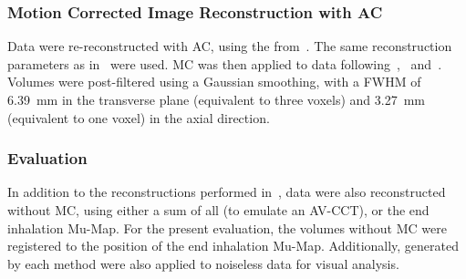             \subsubsection{Motion Corrected Image Reconstruction with AC} \label{sec:comparison_of_motion_correction_methods_incorporating_motion_modelling_for_pet/ct_using_a_single_breath_hold_attenuation_map_attenuation_corrected_image_reconstruction}
                Data were re-reconstructed with \gls{AC}, using the  from~. The same reconstruction parameters as in~ were used. \gls{MC} was then applied to data following~,~ and~. Volumes were post-filtered using a Gaussian smoothing, with a \gls{FWHM} of \SI{6.39}{\milli\metre} in the transverse plane (equivalent to three voxels) and \SI{3.27}{\milli\metre} (equivalent to one voxel) in the axial direction.
            
            \subsubsection{Evaluation} \label{sec:comparison_of_motion_correction_methods_incorporating_motion_modelling_for_pet/ct_using_a_single_breath_hold_attenuation_map_evaluation}
                In addition to the reconstructions performed in~, data were also reconstructed without \gls{MC}, using either a sum of all  (to emulate an \gls{AV-CCT}), or the end inhalation \gls{Mu-Map}. For the present evaluation, the volumes without \gls{MC} were registered to the position of the end inhalation \gls{Mu-Map}. Additionally,  generated by each method were also applied to noiseless data for visual analysis.
                
